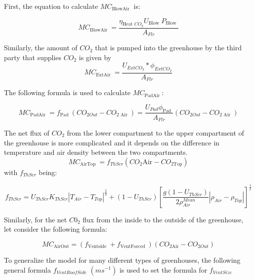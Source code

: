 First, the equation to calculate $MC_{\text {BlowAir }}$ is: 

\begin{equation}
M C_{\text {BlowAir }}=\frac{\eta_{\text {Heat } C O_{2}} U_{\text {Blow }} P_{\text {Blow }}}{A_{Flr}}
\end{equation}

Similarly, the amount of $CO_2$ that is pumped into the greenhouse by the third party that supplies $CO_2$ is given by
\begin{equation}
M C_{\text {ExtAir }}=\frac{U_{ExtCO_{2}} * \phi_{ExtCO_{2}}}{A_{Fl r}}
\end{equation}

The following formula is used to calculate $M C_{\text {PadAir }}$:

\begin{equation}
M C_{\text {PadAir }}=f_{\text {Pad }}\left(C O_{2 O u t}-C O_{2 \text { Air }}\right)=\frac{U_{P a d} \phi_{\text {Pad }}}{A_{F l r}}\left(C O_{2 O u t}-C O_{2 \text { Air }}\right)
\end{equation}

The net flux of $CO_2$ from the lower compartment to the upper compartment of the greenhouse is more complicated and it depends on the difference in temperature and air density between the two compartments.
\begin{equation}
MC_{\text{AirTop }}=f_{ThScr}\left(CO_{2} \text {Air}-CO_{2 \text {Top}}\right)
\end{equation}
with $f_{ThScr}$ being:

\begin{equation}
f_{ThScr}=U_{ThScr}K_{ThScr}\left|T_{Air}-T_{Top}\right|^{\frac{2}{3}}+\left(1-U_{ThScr}\right)\left[\frac{g\left(1-U_{ThScr}\right)}{2 \rho_{Air}^{Mean}}\left|\rho_{Air}-\rho_{Top}\right|\right]^{\frac{1}{2}}
\end{equation}

Similarly, for the net $C0_2$ flux from the inside to the outside of the greenhouse, let consider the following formula:

\begin{equation}
MC_{\text {AirOut}}=\left(f_{\text {Ventside }}+f_{\text {VentForced }}\right)\left(CO_{2 \text {Air}}-CO_{2Out}\right)
\end{equation}

To generalize the model for many different types of greenhouses, the following general formula $f_{VentRoofSide}$ $(ms^{-1})$ is used to set the formula for $f_{VentSize}$

